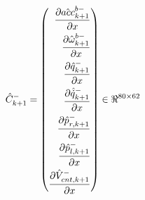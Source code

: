 \begin{equation}
    \label{eq:msr_mat}
    \hat{C}^-_{k+1} = \left(
   \begin{aligned}
   \frac{\partial {\hat{acc}_{k+1}^{b-}}}{\partial {x}} \\
   \frac{\partial {\hat{\omega}^{b-}_{k+1}}}{\partial {x}} \\
    \frac{\partial {\hat{q}_{k+1}^-}}{\partial {x}} \\
    \frac{\partial {\hat{\dot{q}}_{k+1}^-}}{\partial {x}} \\
    \frac{\partial {\hat{p}_{r,k+1}^-}}{\partial {x}} \\
    \frac{\partial {\hat{p}_{l,k+1}^-}}{\partial {x}} \\
	 \frac{\partial {\hat{V}_{cnt,k+1}^{-}}}{\partial {x}} 
   \end{aligned}
	 \right) \in \Re^{80 \times 62}
\end{equation}

%

